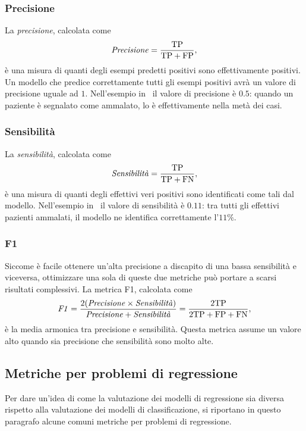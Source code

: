 \subsubsection{Precisione} La \emph{precisione}, calcolata come
\begin{equation*}
    \textrm{\emph{Precisione}} = \frac{\text{TP}}{\text{TP} + \text{FP}},
\end{equation*}
è una misura di quanti degli esempi predetti positivi sono effettivamente positivi.
Un modello che predice correttamente tutti gli esempi positivi avrà un valore di precisione uguale ad $1$.
Nell'esempio in~ il valore di precisione è $0.5$: quando un paziente è segnalato come ammalato, lo è effettivamente nella metà dei casi.

\subsubsection{Sensibilità} La \emph{sensibilità}, calcolata come 
\begin{equation*}
    \textrm{\emph{Sensibilità}} = \frac{\text{TP}}{\text{TP} + \text{FN}},
\end{equation*}
è una misura di quanti degli effettivi veri positivi sono identificati come tali dal modello.
Nell'esempio in~ il valore di sensibilità è $0.11$: tra tutti gli effettivi pazienti ammalati, il modello ne identifica correttamente l'$11\%$.


\subsubsection{F1} 
Siccome è facile ottenere un'alta precisione a discapito di una bassa sensibilità e viceversa, ottimizzare una sola di queste due metriche può portare a scarsi risultati complessivi.
La metrica F1, calcolata come 
\begin{equation*}
    \textrm{\emph{F1}} = \frac{2(\text{\emph{Precisione}} \times \text{\emph{Sensibilità}})}{\text{\emph{Precisione}} + \text{\emph{Sensibilità}}} = \frac{2\text{TP}}{2\text{TP}+ \text{FP}+ \text{FN}},
\end{equation*}
è la media armonica tra precisione e sensibilità. Questa metrica assume un valore alto quando sia precisione che sensibilità sono molto alte.

\subsection{Metriche per problemi di regressione}
Per dare un'idea di come la valutazione dei modelli di regressione sia diversa rispetto alla valutazione dei modelli di classificazione, si riportano in questo paragrafo alcune comuni metriche per problemi di regressione. 

